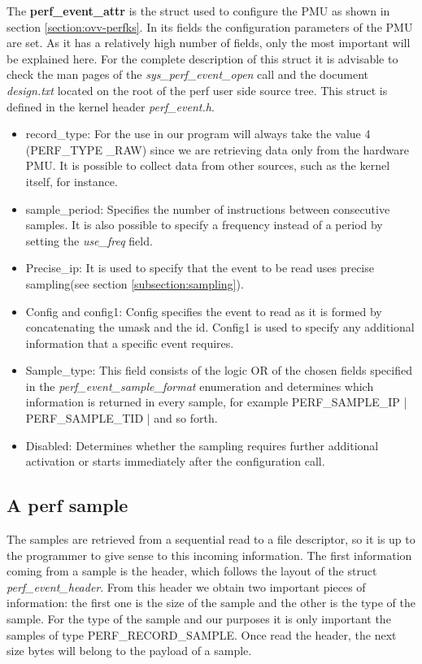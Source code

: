 The \textbf{perf\_event\_attr} is the struct used to configure the PMU as shown in section \ref{section:ovv-perfks}. In its fields the configuration parameters of the PMU are set. As it has a relatively high number of fields, only the most important will be explained here. For the complete description of this struct it is advisable to check the man pages of the \textit{sys\_perf\_event\_open} call and the document \textit{design.txt} located on the root of the perf user side source tree. This struct is defined in the kernel header \textit{perf\_event.h}. 
\begin{itemize}
	\item record\_type: For the use in our program will always take the value 4 (PERF\_TYPE \_RAW) since we are retrieving data only from the hardware PMU. It is possible to collect data from other sources, such as the kernel itself, for instance.
	\item sample\_period: Specifies the number of instructions between consecutive samples. It is also possible to specify a frequency instead of a period by setting the \textit{use\_freq} field.
	\item Precise\_ip: It is used to specify that the event to be read uses precise sampling(see section \ref{subsection:sampling}).
	\item Config and config1: Config specifies the event to read as it is formed by concatenating the umask and the id. Config1 is used to specify any additional information that a specific event requires. 
	\item Sample\_type: This field consists of the logic OR of the chosen fields specified in the \textit{perf\_event\_sample\_format} enumeration and determines which information is returned in every sample, for example PERF\_SAMPLE\_IP | PERF\_SAMPLE\_TID | and so forth.
	\item Disabled: Determines whether the sampling requires further additional activation or starts immediately after the configuration call.
\end{itemize}
     
\subsection{A perf sample}\label{section:pf-samplu}
     
The samples are retrieved from a sequential read to a file descriptor, so it is up to the programmer to give sense to this incoming information. The first information coming from a sample is the header, which follows the layout of the struct \textit{perf\_event\_header}. From this header we obtain two important pieces of information: the first one is the size of the sample and the other is the type of the sample. For the type of the sample and our purposes it is only important the samples of type PERF\_RECORD\_SAMPLE. Once read the header, the next size bytes will belong to the payload of a sample.

